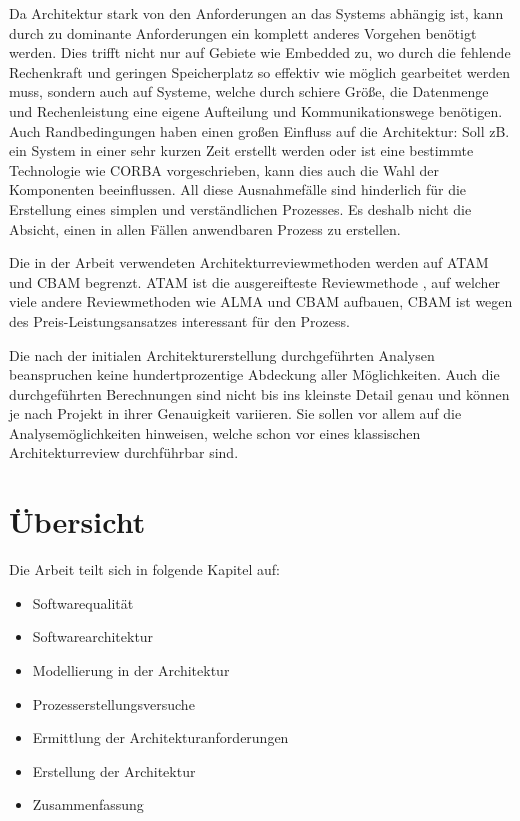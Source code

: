 Da Architektur stark von den Anforderungen an das Systems abhängig ist, kann durch zu dominante Anforderungen ein komplett anderes Vorgehen benötigt werden. Dies trifft nicht nur auf Gebiete wie Embedded zu, wo durch die fehlende Rechenkraft und geringen Speicherplatz so effektiv wie möglich gearbeitet werden muss, sondern auch auf Systeme, welche durch schiere Größe, die Datenmenge und Rechenleistung eine eigene Aufteilung und Kommunikationswege benötigen. Auch Randbedingungen haben einen großen Einfluss auf die Architektur: Soll zB. ein System in einer sehr kurzen Zeit erstellt werden oder ist eine bestimmte Technologie wie CORBA vorgeschrieben, kann dies auch die Wahl der Komponenten beeinflussen. All diese Ausnahmefälle sind hinderlich für die Erstellung eines simplen und verständlichen Prozesses. Es deshalb nicht die Absicht, einen in allen Fällen anwendbaren Prozess zu erstellen.

Die in der Arbeit verwendeten Architekturreviewmethoden werden auf ATAM und CBAM begrenzt. ATAM ist die ausgereifteste Reviewmethode \cite[S. 184]{basiswissen}, auf welcher viele andere Reviewmethoden wie ALMA und CBAM aufbauen, CBAM ist wegen des Preis-Leistungsansatzes interessant für den Prozess.

Die nach der initialen Architekturerstellung durchgeführten Analysen beanspruchen keine hundertprozentige Abdeckung aller Möglichkeiten. Auch die durchgeführten Berechnungen sind nicht bis ins kleinste Detail genau und können je nach Projekt in ihrer Genauigkeit variieren. Sie sollen vor allem auf die Analysemöglichkeiten hinweisen, welche schon vor eines klassischen Architekturreview durchführbar sind.

\section{Übersicht}
Die Arbeit teilt sich in folgende Kapitel auf:

\begin{itemize}
  \item Softwarequalität
  \item Softwarearchitektur
  \item Modellierung in der Architektur
  \item Prozesserstellungsversuche
  \item Ermittlung der Architekturanforderungen
  \item Erstellung der Architektur
  \item Zusammenfassung
\end{itemize}


